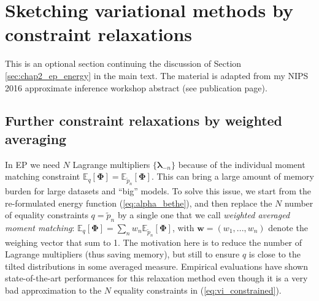 \section{Sketching variational methods by constraint relaxations}
\label{sec:appendix_relaxation}

This is an optional section continuing the discussion of Section \ref{sec:chap2_ep_energy} in the main text. The material is adapted from my NIPS 2016 approximate inference workshop abstract (see publication page).

\subsection{Further constraint relaxations by weighted averaging}

In EP we need $N$ Lagrange multipliers $\{\bm{\lambda}_{-n} \}$ because of the individual moment matching constraint $\mathbb{E}_q[\bm{\Phi}] = \mathbb{E}_{\tilde{p}_n}[\bm{\Phi}]$. This can bring a large amount of memory burden for large datasets and ``big'' models. To solve this issue, we start from the re-formulated energy function (\ref{eq:alpha_bethe}), and then replace the $N$ number of equality constraints $q = \tilde{p}_n$ by a single one that we call \emph{weighted averaged moment matching}: $\mathbb{E}_q[\bm{\Phi}] = \sum_n w_n \mathbb{E}_{\tilde{p}_n}[\bm{\Phi}]$, with $\bm{w} = (w_1, ..., w_n)$ denote the weighing vector that sum to 1. The motivation here is to reduce the number of Lagrange multipliers (thus saving memory), but still to ensure $q$ is close to the tilted distributions in some averaged measure. Empirical evaluations have shown state-of-the-art performances for this relaxation method \citep{hernandez-lobato:bbalpha2016} even though it is a very bad approximation to the $N$ equality constraints in (\ref{eq:vi_constrained}). 

